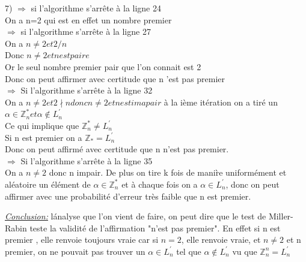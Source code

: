 \documentclass[10pt]{beamer}
\begin{document}
\begin{frame}

7) $\Longrightarrow$  si l'algorithme s'arr\^ete \`a la ligne 24\\
On a n=2 qui est en effet un nombre premier\\
$\Longrightarrow$ si l'algorithme s'arr\^ete \`a la ligne 27\\
On a $n \neq 2 et 2/n$\\
Donc $ n\neq 2 et n est paire $\\
Or le seul nombre premier pair que l'on connait est 2\\
Donc on peut affirmer avec certitude que n 'est pas premier \\
$\Longrightarrow$  Si l'algorithme s'arr\^ete \`a la ligne 32\\
On a $n\neq 2 et 2\nmid n donc n\neq 2 et n est imapair $ \`a la i\`eme it\'eration on a tir\'e un $\alpha \in \mathbb{Z}_n^{*} et \alpha \notin L^{'}_n$\\
Ce qui implique que $\mathbb{Z}_n^{*} \neq L^{'}_n$ \\
Si n est premier on a $ \mathbb{Z}_{*} = L^{'}_n$ \\
Donc on peut affirm\'e avec certitude que n n'est pas premier.\\
$ \Longrightarrow$ Si l'algorithme s'arr\^ete \`a la ligne 35\\
On a $n\neq 2$ donc n impair. De plus on tire k fois de mani\`re uniformément  et al\'eatoire un \'el\'ement de $\alpha \in \mathbb{Z}_n^{*}$  et \`a chaque fois on a $\alpha \in L^{'}_n$, donc on peut affirmer avec une probabilit\'e d'erreur tr\`es faible que n est premier.\\

\end{frame}


\begin{frame}

\emph{\underline{Conclusion:}}
l\'analyse que l'on vient de faire, on peut dire que le test de Miller-Rabin teste la validit\'e de l'affirmation
"n'est pas premier". En effet si n est premier , elle renvoie toujours vraie car si $ n=2$, elle renvoie vraie, et $n \neq 2$ et n premier, on ne pouvait pas trouver un $\alpha \in L^{'}_n$ tel que $ \alpha \notin L^{'}_n$ vu que $\mathbb{Z}_n^{n} =L^{'}_n $

\end{frame}
\end{document}
